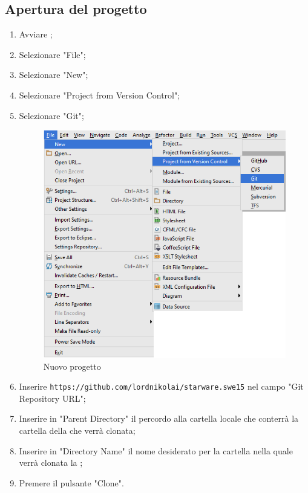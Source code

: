 \documentclass[12pt,a4paper]{article}
\begin{document}
	\subsection{Apertura del progetto}\label{nuovoProgetto}
	\begin{enumerate}
		\item Avviare  ;
		\item Selezionare "File";
		\item Selezionare "New";
		\item Selezionare "Project from Version Control";
		\item Selezionare "Git";

		\begin{center}
			\begin{figure}[H]
				\centering \includegraphics[max width=\myheight]{../img/manualeSviluppatore/newProject.png}
				\caption{Nuovo progetto}
			\end{figure}
		\end{center}
		\newpage

		\item Inserire \texttt{https://github.com/lordnikolai/starware.swe15} nel campo "Git Repository URL"; 
		\item Inserire in "Parent Directory" il percordo alla cartella locale che conterrà la cartella della  che verrà clonata; 
		\item Inserire in "Directory Name" il nome desiderato per la cartella nella quale verrà clonata la ;
		\item Premere il pulsante "Clone".
	\end{enumerate}
\end{document}
